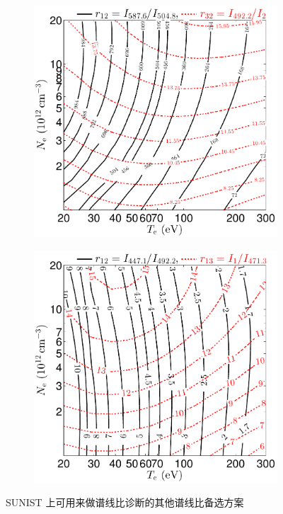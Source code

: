 \begin{figure}
  \centering
  \begin{subfigure}{0.45\textwidth}
    \includegraphics[width=\textwidth]{1-4to5-7to5-getTeNe-lineratio.pdf}
    \caption{}
    \label{fig:chap03:lineratio-backup:1}
  \end{subfigure}
  \hspace{0.05\textwidth}
  \begin{subfigure}{0.45\textwidth}
    \includegraphics[width=\textwidth]{1-9to8-9to7-getTeNe-lineratio.pdf}
    \caption{}
    \label{fig:chap03:lineratio-backup:2}
  \end{subfigure}
  \caption{SUNIST 上可用来做谱线比诊断的其他谱线比备选方案}
  \label{fig:chap03:lineratio-backup}
\end{figure}

